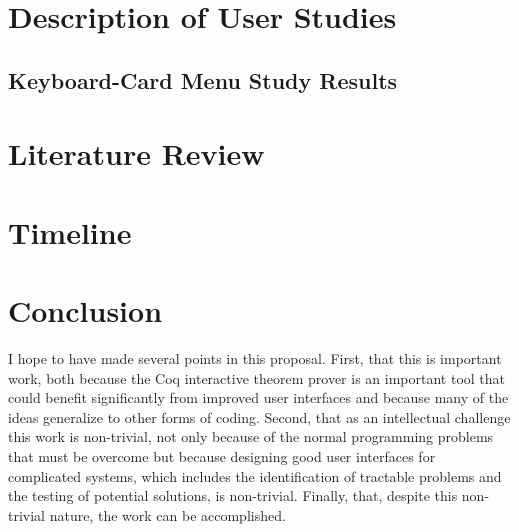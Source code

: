 \documentclass[11pt]{amsart}
\begin{document}
\section{Description of User Studies}


\subsection{Keyboard-Card Menu Study Results}

\section{Literature Review}



\section{Timeline}



\section{Conclusion}

I hope to have made several points in this proposal.  First, that this is important work, both because the Coq interactive theorem prover is an important tool that could benefit significantly from improved user interfaces and because many of the ideas generalize to other forms of coding.  Second, that as an intellectual challenge this work is non-trivial, not only because of the normal programming problems that must be overcome but because designing good user interfaces for complicated systems, which includes the identification of tractable problems and the testing of potential solutions, is non-trivial.  Finally, that, despite this non-trivial nature, the work can be accomplished.




\end{document}
